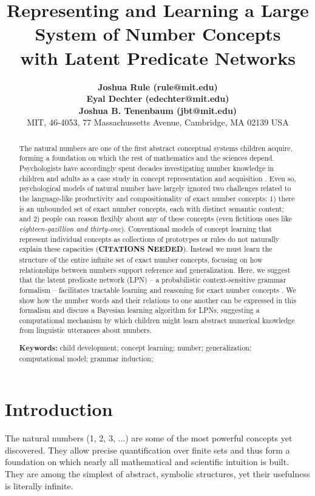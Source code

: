 \documentclass[10pt,letterpaper]{article}
\title{Representing and Learning a Large System of Number Concepts \\ with Latent Predicate Networks}
\author{
  {\large \bf Joshua Rule (rule@mit.edu)}\\
  {\large \bf Eyal Dechter (edechter@mit.edu)}\\
  {\large \bf Joshua B. Tenenbaum (jbt@mit.edu)}\\
  MIT, 46-4053, 77 Massachussetts Avenue, Cambridge, MA 02139 USA}
\begin{document}
\maketitle

\begin{abstract}
  The natural numbers are one of the first abstract conceptual systems
  children acquire, forming a foundation on which the rest of
  mathematics and the sciences depend. Psychologists have accordingly
  spent decades investigating number knowledge in children and adults
  as a case study in concept representation and acquisition
  \citep{fuson1988children,galGel2005,Car2009}. Even so, psychological
  models of natural number have largely ignored two challenges related
  to the language-like productivity and compositionality of exact
  number concepts: 1) there is an unbounded set of exact number
  concepts, each with distinct semantic content; and 2) people can
  reason flexibly about any of these concepts (even fictitious ones
  like \emph{eighteen-gazillion and thirty-one}). Conventional models
  of concept learning that represent individual concepts as
  collections of prototypes or rules do not naturally explain these
  capacities ({\bf CITATIONS NEEDED}). Instead we must learn the
  structure of the entire infinite set of exact number concepts,
  focusing on how relationships between numbers support reference and
  generalization. Here, we suggest that the latent predicate network
  (LPN) -- a probabilistic context-sensitive grammar formalism --
  facilitates tractable learning and reasoning for exact number
  concepts \citep{DecRulTenming}. We show how the number words and
  their relations to one another can be expressed in this formalism
  and discuss a Bayesian learning algorithm for LPNs, suggesting a
  computational mechanism by which children might learn abstract
  numerical knowledge from linguistic utterances about numbers.

  \textbf{Keywords:}
  child development; concept learning; number; generalization;
  computational model; grammar induction;
\end{abstract}

\section{Introduction}

The natural numbers (1, 2, 3, $\ldots$) are some of the most powerful
concepts yet discovered. They allow precise quantification over finite
sets and thus form a foundation on which nearly all mathematical and
scientific intuition is built. They are among the simplest of
abstract, symbolic structures, yet their usefulness is literally
infinite.
\end{document}
